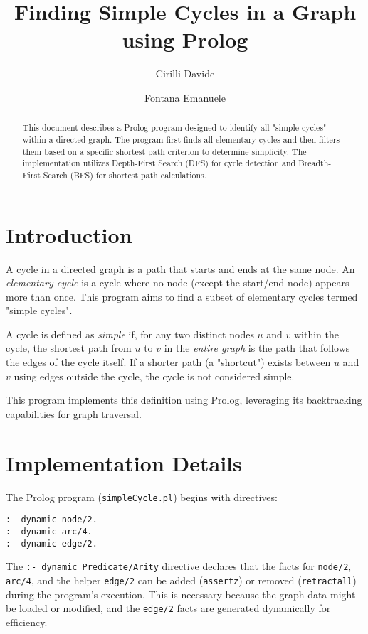 \documentclass[12pt,a4paper]{article}
\title{Finding Simple Cycles in a Graph using Prolog} %
\author[1]{Cirilli Davide}
\author[2]{Fontana Emanuele}
\affil[1,2]{Department of Computer Science, Università degli Studi di Bari}
\begin{document}
\maketitle

\begin{abstract}
This document describes a Prolog program designed to identify all "simple cycles" within a directed graph. The program first finds all elementary cycles and then filters them based on a specific shortest path criterion to determine simplicity. The implementation utilizes Depth-First Search (DFS) for cycle detection and Breadth-First Search (BFS) for shortest path calculations.
\end{abstract}

\tableofcontents

\section{Introduction}

A cycle in a directed graph is a path that starts and ends at the same node. An \textit{elementary cycle} is a cycle where no node (except the start/end node) appears more than once. This program aims to find a subset of elementary cycles termed "simple cycles".

A cycle is defined as \textit{simple} if, for any two distinct nodes $u$ and $v$ within the cycle, the shortest path from $u$ to $v$ in the \textit{entire graph} is the path that follows the edges of the cycle itself. If a shorter path (a "shortcut") exists between $u$ and $v$ using edges outside the cycle, the cycle is not considered simple.

This program implements this definition using Prolog, leveraging its backtracking capabilities for graph traversal.

\section{Implementation Details}

The Prolog program (\texttt{simpleCycle.pl}) begins with directives:
\begin{verbatim}
:- dynamic node/2.
:- dynamic arc/4.
:- dynamic edge/2.
\end{verbatim}
The \texttt{:- dynamic Predicate/Arity} directive declares that the facts for \texttt{node/2}, \texttt{arc/4}, and the helper \texttt{edge/2} can be added (\texttt{assertz}) or removed (\texttt{retractall}) during the program's execution. This is necessary because the graph data might be loaded or modified, and the \texttt{edge/2} facts are generated dynamically for efficiency.
\end{document}
